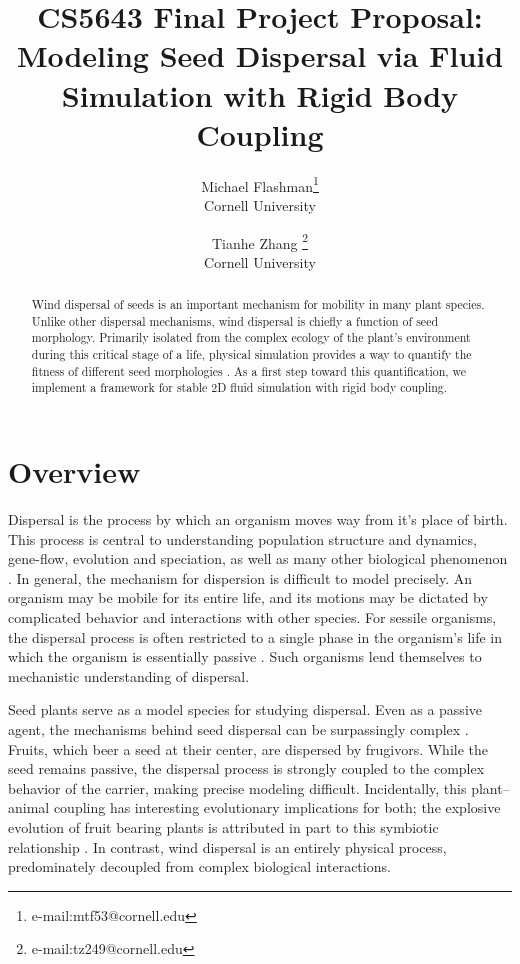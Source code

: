 \documentclass[annual]{acmsiggraph}
\title{CS5643 Final Project Proposal: \\ Modeling Seed Dispersal via Fluid Simulation with Rigid Body Coupling}
\author{Michael Flashman\thanks{e-mail:mtf53@cornell.edu}\\Cornell University \and Tianhe Zhang \thanks{e-mail:tz249@cornell.edu}\\Cornell University}
\begin{document}
\maketitle

\begin{abstract}
Wind dispersal of  seeds is an important mechanism for mobility in many plant species.  Unlike other dispersal mechanisms, wind dispersal is chiefly a function of seed morphology.  Primarily isolated from the  complex ecology of the plant's environment during this critical stage of a life, physical simulation provides a way to  quantify the fitness of different seed morphologies .   As a first step toward this quantification, we  implement a  framework for stable 2D fluid simulation with rigid body coupling.
\end{abstract}

\keywordlist

\copyrightspace

\section{Overview}


Dispersal is the process by which an organism moves way from it's place of birth.  This process is central to understanding  population structure and dynamics, gene-flow, evolution and speciation, as well as many other biological phenomenon \cite{levin1989}.   In general, the mechanism for dispersion is difficult to model precisely. An organism may be mobile for its entire life, and its motions may be dictated by complicated behavior and interactions with other species.  For sessile organisms, the dispersal process is often restricted to a single phase in the organism's life in which the organism is essentially passive \cite{nathan2000}.   Such organisms lend themselves to mechanistic understanding of dispersal.  

Seed plants serve as a model species for studying dispersal. Even as a passive agent, the mechanisms behind seed dispersal can be surpassingly complex \cite{wilson2000}.  Fruits, which beer a seed at their center, are dispersed by frugivors.  While the seed remains passive, the dispersal process is strongly coupled  to the complex behavior of the carrier, making precise modeling difficult.  Incidentally, this plant--animal coupling has interesting evolutionary implications for both; the explosive evolution of fruit bearing plants is  attributed in part to this symbiotic relationship \cite{lorts2008}.  In contrast, wind dispersal is an entirely physical process, predominately decoupled from complex biological interactions.    
\end{document}
